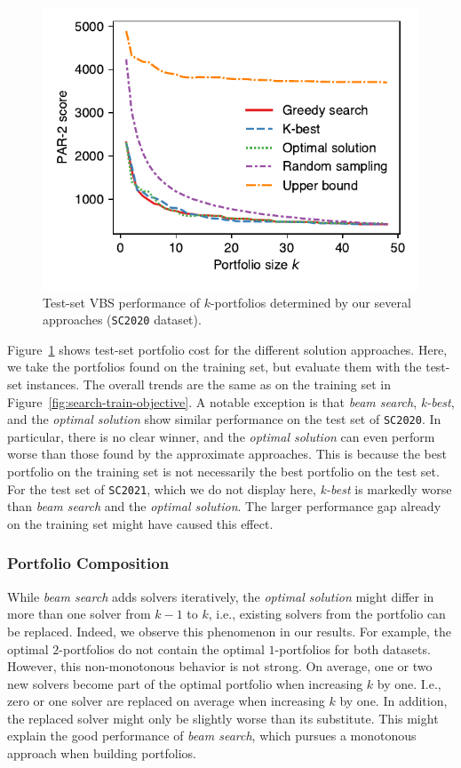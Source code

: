\documentclass[conference]{IEEEtran}
\begin{document}
\begin{figure}[t]
	\centering
	\includegraphics[width=0.9\columnwidth, trim=0 15 0 10, clip]{plots/search-test-objective-2020.pdf}
	\caption{Test-set VBS performance of $k$-portfolios determined by our several approaches (\texttt{SC2020} dataset).}
	\label{fig:search-test-objective-2020}
\end{figure}

Figure~\ref{fig:search-test-objective-2020} shows test-set portfolio cost for the different solution approaches.
Here, we take the portfolios found on the training set, but evaluate them with the test-set instances.
The overall trends are the same as on the training set in Figure~\ref{fig:search-train-objective}.
A notable exception is that \emph{beam search}, \emph{k-best}, and the \emph{optimal solution} show similar performance on the test set of \texttt{SC2020}.
In particular, there is no clear winner, and the \emph{optimal solution} can even perform worse than those found by the approximate approaches. 
This is because the best portfolio on the training set is not necessarily the best portfolio on the test set.
For the test set of \texttt{SC2021}, which we do not display here, \emph{k-best} is markedly worse than \emph{beam search} and the \emph{optimal solution}. 
The larger performance gap already on the training set might have caused this effect.

\subsubsection{Portfolio Composition}

While \emph{beam search} adds solvers iteratively, the \emph{optimal solution} might differ in more than one solver from $k-1$ to $k$, i.e., existing solvers from the portfolio can be replaced.
Indeed, we observe this phenomenon in our results.
For example, the optimal $2$-portfolios do not contain the optimal $1$-portfolios for both datasets.
However, this non-monotonous behavior is not strong.
On average, one or two new solvers become part of the optimal portfolio when increasing $k$ by one.
I.e., zero or one solver are replaced on average when increasing $k$ by one.
In addition, the replaced solver might only be slightly worse than its substitute.
This might explain the good performance of \emph{beam search}, which pursues a monotonous approach when building portfolios.
\end{document}

